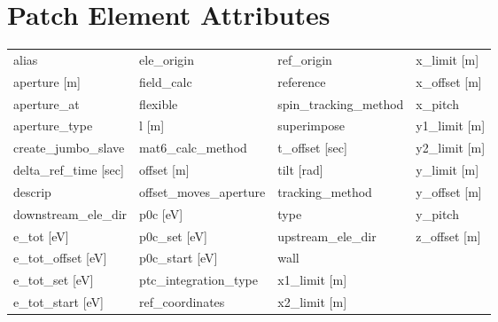  \section{Patch Element Attributes}
 \label{s:list.patch}
 
 \begin{tabular}{llll} \toprule
alias                            & ele_origin                       & ref_origin                       & x_limit [m]                      \\
aperture [m]                     & field_calc                       & reference                        & x_offset [m]                     \\
aperture_at                      & flexible                         & spin_tracking_method             & x_pitch                          \\
aperture_type                    & l [m]                            & superimpose                      & y1_limit [m]                     \\
create_jumbo_slave               & mat6_calc_method                 & t_offset [sec]                   & y2_limit [m]                     \\
delta_ref_time [sec]             & offset [m]                       & tilt [rad]                       & y_limit [m]                      \\
descrip                          & offset_moves_aperture            & tracking_method                  & y_offset [m]                     \\
downstream_ele_dir               & p0c [eV]                         & type                             & y_pitch                          \\
e_tot [eV]                       & p0c_set [eV]                     & upstream_ele_dir                 & z_offset [m]                     \\
e_tot_offset [eV]                & p0c_start [eV]                   & wall                             &                                  \\
e_tot_set [eV]                   & ptc_integration_type             & x1_limit [m]                     &                                  \\
e_tot_start [eV]                 & ref_coordinates                  & x2_limit [m]                     &                                  \\
 \bottomrule
 \end{tabular}
 \vfill
 
